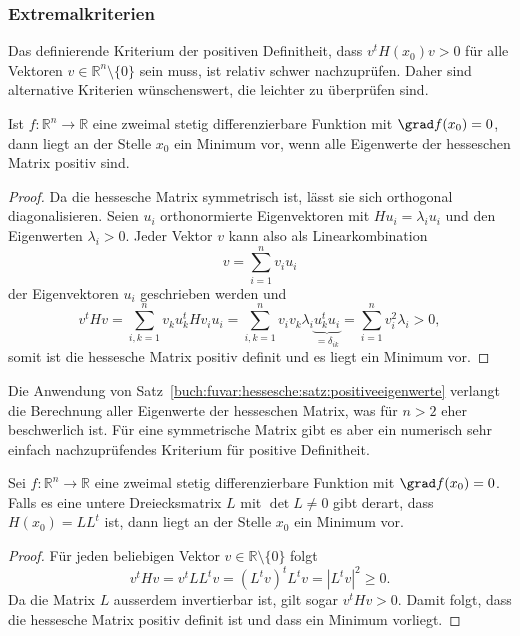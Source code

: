 %
%
\subsubsection{Extremalkriterien}
Das definierende Kriterium der positiven Definitheit, dass $v^tH(x_0)v>0$
für alle Vektoren $v\in\mathbb{R}^n\setminus\{0\}$ sein muss, ist
relativ schwer nachzuprüfen.
Daher sind alternative Kriterien wünschenswert, die leichter zu überprüfen
sind.

\begin{satz}
\label{buch:fuvar:hessesche:satz:positiveeigenwerte}
Ist $f\colon\mathbb{R}^n\to\mathbb{R}$ eine zweimal stetig differenzierbare
Funktion mit $\grad f(x_0)=0$, dann liegt an der Stelle $x_0$ ein Minimum
vor, wenn alle Eigenwerte der hesseschen Matrix positiv sind.
\end{satz}

\begin{proof}
Da die hessesche Matrix symmetrisch ist, lässt sie sich orthogonal
diagonalisieren.
Seien $u_i$ orthonormierte Eigenvektoren mit $Hu_i=\lambda_iu_i$ und
den Eigenwerten $\lambda_i>0$.
Jeder Vektor $v$ kann also als Linearkombination
\[
v = \sum_{i=1}^n v_iu_i
\]
der Eigenvektoren $u_i$ geschrieben werden und 
\[
v^tHv
=
\sum_{i,k=1}^n
v_ku_k^t
Hv_iu_i
=
\sum_{i,k=1}^n v_iv_k\lambda_i \underbrace{u_k^tu_i}_{\displaystyle=\delta_{ik}}
=
\sum_{i=1}^{n} v_i^2\lambda_i > 0,
\]
somit ist die hessesche Matrix positiv definit und es liegt ein
Minimum vor.
\end{proof}

Die Anwendung von Satz~\ref{buch:fuvar:hessesche:satz:positiveeigenwerte}
verlangt die Berechnung aller Eigenwerte der hesseschen Matrix, was für
$n>2$ eher beschwerlich ist.
Für eine symmetrische Matrix gibt es aber ein numerisch sehr einfach
nachzuprüfendes Kriterium für positive Definitheit.

\begin{satz}
Sei $f\colon\mathbb{R}^n\to\mathbb{R}$ eine zweimal stetig differenzierbare
Funktion mit $\grad f(x_0)=0$.
Falls es eine untere Dreiecksmatrix $L$ mit $\det L\ne 0$ gibt derart,
dass $H(x_0)=LL^t$ ist, dann liegt an der Stelle $x_0$ ein Minimum vor.
\end{satz}

\begin{proof}
Für jeden beliebigen Vektor $v\in\mathbb{R}\setminus\{0\}$ folgt
\[
v^tHv
=
v^tLL^tv
=
(L^tv)^t L^tv
=
|L^tv|^2
\ge
0.
\]
Da die Matrix $L$ ausserdem invertierbar ist, gilt sogar $v^tHv>0$.
Damit folgt, dass die hessesche Matrix positiv definit ist und dass
ein Minimum vorliegt.
\end{proof}


